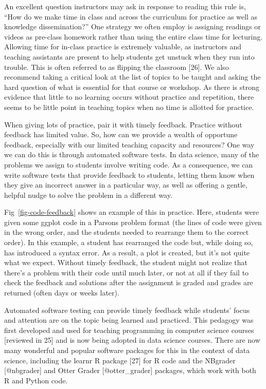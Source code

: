\documentclass[
  10pt,
  letterpaper,
]{article}
\begin{document}
An excellent question instructors may ask in response to reading this
rule is, ``How do we make time in class and across the curriculum for
practice as well as knowledge dissemination?'' One strategy we often
employ is assigning readings or videos as pre-class homework rather than
using the entire class time for lecturing. Allowing time for in-class
practice is extremely valuable, as instructors and teaching assistants
are present to help students get unstuck when they run into trouble.
This is often referred to as flipping the classroom {[}26{]}. We also
recommend taking a critical look at the list of topics to be taught and
asking the hard question of what is essential for that course or
workshop. As there is strong evidence that little to no learning occurs
without practice and repetition, there seems to be little point in
teaching topics when no time is allotted for practice.

When giving lots of practice, pair it with timely feedback. Practice
without feedback has limited value. So, how can we provide a wealth of
opportune feedback, especially with our limited teaching capacity and
resources? One way we can do this is through automated software tests.
In data science, many of the problems we assign to students involve
writing code. As a consequence, we can write software tests that provide
feedback to students, letting them know when they give an incorrect
answer in a particular way, as well as offering a gentle, helpful nudge
to solve the problem in a different way.

Fig~\ref{fig-code-feedback} shows an example of this in practice. Here,
students were given some ggplot code in a Parsons problem format (the
lines of code were given in the wrong order, and the students needed to
rearrange them to the correct order). In this example, a student has
rearranged the code but, while doing so, has introduced a syntax error.
As a result, a plot is created, but it's not quite what we expect.
Without timely feedback, the student might not realize that there's a
problem with their code until much later, or not at all if they fail to
check the feedback and solutions after the assignment is graded and
grades are returned (often days or weeks later).

Automated software testing can provide timely feedback while students'
focus and attention are on the topic being learned and practiced. This
pedagogy was first developed and used for teaching programming in
computer science courses {[}reviewed in 25{]} and is now being adopted
in data science courses. There are now many wonderful and popular
software packages for this in the context of data science, including the
learnr R package {[}27{]} for R code and the NBgrader {[}@nbgrader{]}
and Otter Grader {[}@otter\_grader{]} packages, which work with both R
and Python code.
\end{document}
